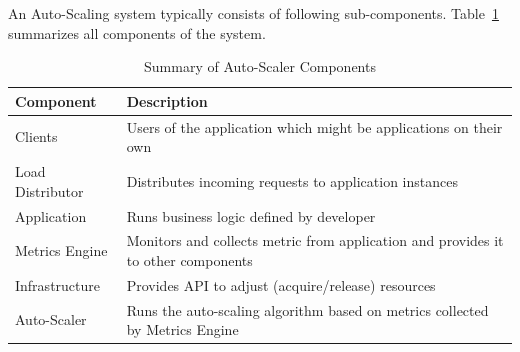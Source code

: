 \noindent An Auto-Scaling system typically consists of following sub-components. Table~\ref{tab:auto-scaler-sum} summarizes all components of the system.
\begin{table}[!htbp]
    \begin{tabular}{ll}
        \toprule
        \textbf{Component} & \textbf{Description}\\
        \midrule
        Clients & Users of the application which might be applications on their own\\
        Load Distributor & Distributes incoming requests to application instances\\
        Application & Runs business logic defined by developer\\
        Metrics Engine & Monitors and collects metric from application and provides it to other components\\
        Infrastructure & Provides API to adjust (acquire/release) resources\\
        Auto-Scaler & Runs the auto-scaling algorithm based on metrics collected by Metrics Engine\\
        \bottomrule
    \end{tabular}
    \centering
    \caption{Summary of Auto-Scaler Components}
    \label{tab:auto-scaler-sum}
\end{table}

